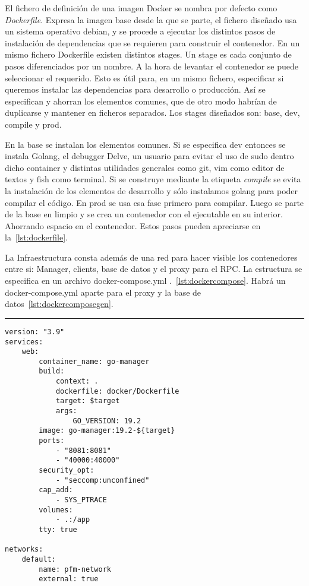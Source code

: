 El fichero de definición de una imagen Docker se nombra por defecto como \textit{Dockerfile}.
Expresa la imagen base desde la que se parte, el fichero diseñado usa un sistema operativo debian, y se procede a ejecutar los distintos pasos de instalación de dependencias que se requieren para construir el contenedor.
En un mismo fichero Dockerfile existen distintos stages.
Un stage es cada conjunto de pasos diferenciados por un nombre.
A la hora de levantar el contenedor se puede seleccionar el requerido.
Esto es útil para, en un mismo fichero, especificar si queremos instalar las dependencias para desarrollo o producción.
Así se especifican y ahorran los elementos comunes, que de otro modo habrían de duplicarse y mantener en ficheros separados.
Los stages diseñados son: base, dev, compile y prod.

En la base se instalan los elementos comunes.
Si se especifica dev entonces se instala Golang, el debugger Delve, un usuario para evitar el uso de sudo dentro dicho container y distintas utilidades generales como git, vim como editor de textos y fish como terminal.
Si se construye mediante la etiqueta \textit{compile} se evita la instalación de los elementos de desarrollo y sólo instalamos golang para poder compilar el código.
En prod se usa esa fase primero para compilar.
Luego se parte de la base en limpio y se crea un contenedor con el ejecutable en su interior.
Ahorrando espacio en el contenedor.
Estos pasos pueden apreciarse en la~\cref{lst:dockerfile}.

La Infraestructura consta además de una red para hacer visible los contenedores entre si: Manager, clients, base de datos y el proxy para el RPC\@.
La estructura se especifica en un archivo docker-compose.yml .~\cref{lst:dockercompose}.
Habrá un docker-compose.yml aparte para el proxy y la base de datos~\cref{lst:dockercomposegen}.

\phantom{blank}
\vspace{10mm}

\hrule

\begin{lstlisting}[language=docker-compose-2,caption={Docker-compose.yml para cada proyecto golang: Manager, client y control},breaklines=true,label={lst:dockercompose}]
version: "3.9"
services:
    web:
        container_name: go-manager
        build:
            context: .
            dockerfile: docker/Dockerfile
            target: $target
            args:
                GO_VERSION: 19.2
        image: go-manager:19.2-${target}
        ports:
            - "8081:8081"
            - "40000:40000"
        security_opt:
            - "seccomp:unconfined"
        cap_add:
            - SYS_PTRACE
        volumes:
            - .:/app
        tty: true

networks:
    default:
        name: pfm-network
        external: true
\end{lstlisting}


